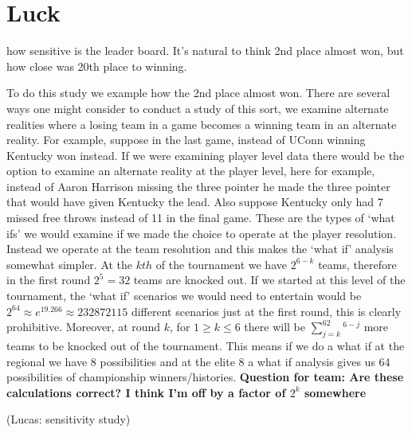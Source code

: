 \section{Luck}
how sensitive is the leader board. It's natural to think 2nd place almost won, but how close was 20th place to winning. 


To do this study we example how the 2nd place almost won. There are several ways one might consider to conduct a study of this sort, we examine alternate realities where a losing team in a game becomes a winning team in an alternate reality. 
For example, suppose in the last game, instead of UConn winning Kentucky won instead. If we were examining player level data there would be the option to examine an alternate reality at the player level, here for example, instead of Aaron Harrison missing the three pointer he made the three pointer that would have given Kentucky the lead. Also suppose Kentucky only had 7 missed free throws instead of 11 in the final game. These are the types of `what ifs' we would examine if we made the choice to operate at the player resolution. Instead we operate at the team resolution and this makes the `what if' analysis somewhat simpler. At the $kth$ of the tournament we have $2^{6-k}$ teams, therefore in the first round $2^5 = 32$ teams are knocked out. If we started at this level of the tournament, the `what if' scenarios we would need to entertain would be $2^64 \approx e^{19.266}\approx 232872115$ different scenarios just at the first round, this is clearly prohibitive. Moreover, at round $k$, for $1\geq k \leq 6$ there will be $\sum_{j=k}^62^{6-j}$ more teams to be knocked out of the tournament. This means if we do a what if at the regional we have 8 possibilities and at the elite 8 a what if analysis gives us 64 possibilities of championship winners/histories. \textbf{Question for team: Are these calculations correct? I think I'm off by a factor of $2^k$ somewhere}


(Lucas: sensitivity study)

